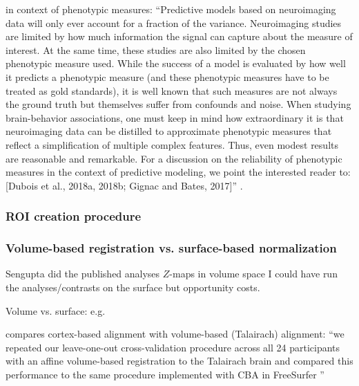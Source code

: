 %
\citet{scheinost2019ten} in context of phenotypic measures: ``Predictive models
based on neuroimaging data will only ever account for a fraction of the
variance. Neuroimaging studies are limited by how much information the signal
can capture about the measure of interest. At the same time, these studies are
also limited by the chosen phenotypic measure used.  While the success of a
model is evaluated by how well it predicts a phenotypic measure (and these
phenotypic measures have to be treated as gold standards), it is well known that
such measures are not always the ground truth but themselves suffer from
confounds and noise.  When studying brain-behavior associations, one must keep
in mind how extraordinary it is that neuroimaging data can be distilled to
approximate phenotypic measures that reflect a simplification of multiple
complex features. Thus, even modest results are reasonable and remarkable. For a
discussion on the reliability of phenotypic measures in the context of
predictive modeling, we point the interested reader to: [Dubois et al., 2018a,
2018b; Gignac and Bates, 2017]'' \citep{scheinost2019ten}.


\subsubsection{ROI creation procedure}



\subsubsection{Volume-based registration vs. surface-based normalization}

%
Sengupta did the published analyses $Z$-maps in volume space
%
I could have run the analyses/contrasts on the surface but opportunity costs.
%

Volume vs. surface: e.g. \citep{desai2005volumetric}

\citep{weiner2018defining} compares cortex-based alignment
\citep{fischl1999high} with volume-based (Talairach) alignment: ``we repeated
our leave-one-out cross-validation procedure across all 24 participants with an
affine volume-based registration to the Talairach brain and compared this
performance to the same procedure implemented with CBA in FreeSurfer
\citep{weiner2018defining}''




